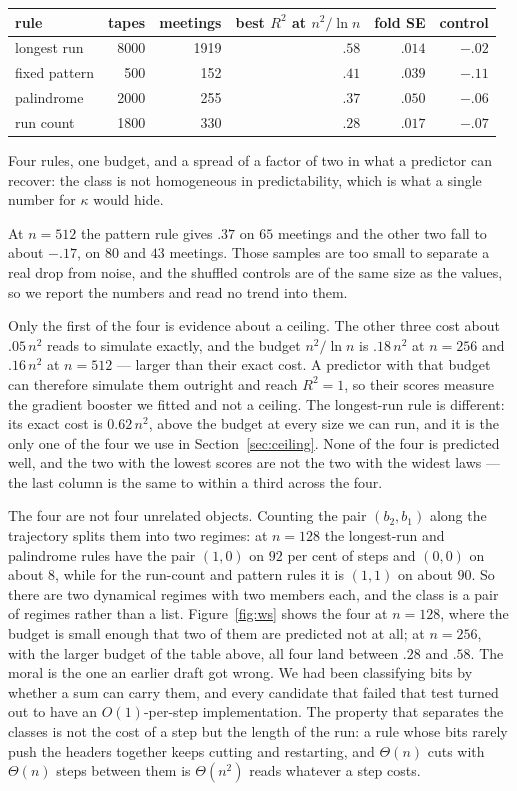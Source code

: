 \documentclass[11pt]{article}
\begin{document}
\begin{center}
\small
\begin{tabular}{lrrrrr}
\toprule
rule & tapes & meetings & best $R^2$ at $n^2/\ln n$ & fold SE & control \\
\midrule
longest run & 8000 & 1919 & $.58$ & $.014$ & $-.02$ \\
fixed pattern & 500 & 152 & $.41$ & $.039$ & $-.11$ \\
palindrome & 2000 & 255 & $.37$ & $.050$ & $-.06$ \\
run count & 1800 & 330 & $.28$ & $.017$ & $-.07$ \\
\bottomrule
\end{tabular}
\end{center}

Four rules, one budget, and a spread of a factor of two in what a predictor can recover: the class
is not homogeneous in predictability, which is what a single number for $\kappa$ would hide.

At $n=512$ the pattern rule gives $.37$ on $65$ meetings and the other two fall to about $-.17$, on
$80$ and $43$ meetings. Those samples are too small to separate a real drop from noise, and the
shuffled controls are of the same size as the values, so we report the numbers and read no trend
into them.

Only the first of the four is evidence about a ceiling. The other three cost about $.05\,n^2$ reads
to simulate exactly, and the budget $n^2/\ln n$ is $.18\,n^2$ at $n=256$ and $.16\,n^2$ at $n=512$
--- larger than their exact cost. A predictor with that budget can therefore simulate them
outright and reach $R^2=1$, so their scores measure the gradient booster we fitted and not a
ceiling. The longest-run rule is different: its exact cost is $0.62\,n^2$, above the budget at every
size we can run, and it is the only one of the four we use in Section~\ref{sec:ceiling}. None of the four is predicted well, and the two with the lowest scores are not the two with
the widest laws --- the last column is the same to within a third across the four.

The four are not four unrelated objects. Counting the pair $(b_2,b_1)$ along the trajectory splits
them into two regimes: at $n=128$ the longest-run and palindrome rules have the pair $(1,0)$ on $92$ per cent of
steps and $(0,0)$ on about $8$, while for the run-count and pattern rules it is $(1,1)$ on about $90$.
So there are two dynamical regimes with two members each, and the class is a pair of regimes rather
than a list. Figure~\ref{fig:ws} shows the four at $n=128$, where the budget is small enough that two of them are
predicted not at all; at $n=256$, with the larger budget of the table above, all four land between
$.28$ and $.58$. The moral is the one an earlier draft got wrong. We had been classifying bits by
whether a sum can
carry them, and every candidate that failed that test turned out to have an $O(1)$-per-step
implementation. The property that separates the classes is not the cost of a step but the length of
the run: a rule whose bits rarely push the headers together keeps cutting and restarting, and
$\Theta(n)$ cuts with $\Theta(n)$ steps between them is $\Theta(n^2)$ reads whatever a step costs.
\end{document}
